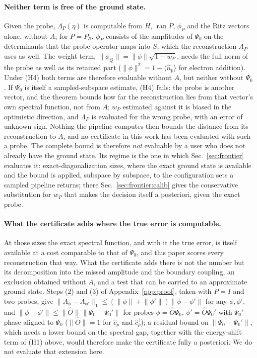 \paragraph{Neither term is free of the ground state.} Given the probe, $\Lambda_P(\eta)$ is computable
from $H$, $\operatorname{ran}P$, $\phi_P$ and the Ritz vectors alone, without $A$; for $P=P_{\mathcal S}$,
$\phi_P$ consists of the amplitudes of $\Psi_0$ on the determinants that the probe operator maps into
$S$, which the reconstruction $A_P$ uses as well. The weight term, $\lVert\phi_Q\rVert=\lVert\phi\rVert\sqrt{1-w_P}$,
needs the full norm of the probe as well as its retained part ($\lVert\phi\rVert^{2}=1-\langle\hat n_p\rangle$
for electron addition). Under (H4) both terms are therefore evaluable without $A$, but neither without
$\Psi_0$. If $\Psi_0$ is itself a sampled-subspace estimate, (H4) fails: the probe is another vector, and
the theorem bounds how far the reconstruction lies from that vector's own spectral function, not from $A$;
$w_P$ estimated against it is biased in the optimistic direction, and $\Lambda_P$ is evaluated for the
wrong probe, with an error of unknown sign. Nothing the pipeline computes then bounds the distance from
its reconstruction to $A$, and no certificate in this work has been evaluated with such a probe. The
complete bound is therefore \emph{not} evaluable by a user who does not already have the ground state.
Its regime is the one in which Sec.~\ref{sec:frontier} evaluates it: exact-diagonalization sizes, where
the exact ground state is available and the bound is applied, subspace by subspace, to the configuration
sets a sampled pipeline returns; there Sec.~\ref{sec:frontier:calib} gives the conservative substitution
for $w_P$ that makes the decision itself a posteriori, given the exact probe.

\paragraph{What the certificate adds where the true error is computable.} At those sizes the exact
spectral function, and with it the true error, is itself available at a cost comparable to that of
$\Psi_0$, and this paper scores every reconstruction that way. What the certificate adds there is not
the number but its decomposition into the missed amplitude and the boundary coupling, an exclusion
obtained without $A$, and a test that can be carried to an approximate ground state. Steps (2) and (3)
of Appendix~\ref{app:proof}, taken with $P=I$ and two probes, give
$\lVert A_\phi-A_{\phi'}\rVert_1\le(\lVert\phi\rVert+\lVert\phi'\rVert)\lVert\phi-\phi'\rVert$ for any
$\phi,\phi'$, and $\lVert\phi-\phi'\rVert\le\lVert\hat O\rVert\,\lVert\Psi_0-\Psi_0'\rVert$ for probes
$\phi=\hat O\Psi_0$, $\phi'=\hat O\Psi_0'$ with $\Psi_0'$ phase-aligned to $\Psi_0$ ($\lVert\hat O\rVert=1$ for
$\hat c_p$ and $\hat c^\dagger_p$); a residual bound on $\lVert\Psi_0-\Psi_0'\rVert$, which needs a lower bound on the spectral gap,
together with the energy-shift term of (H1) above, would therefore make the certificate fully a
posteriori. We do not evaluate that extension here.

